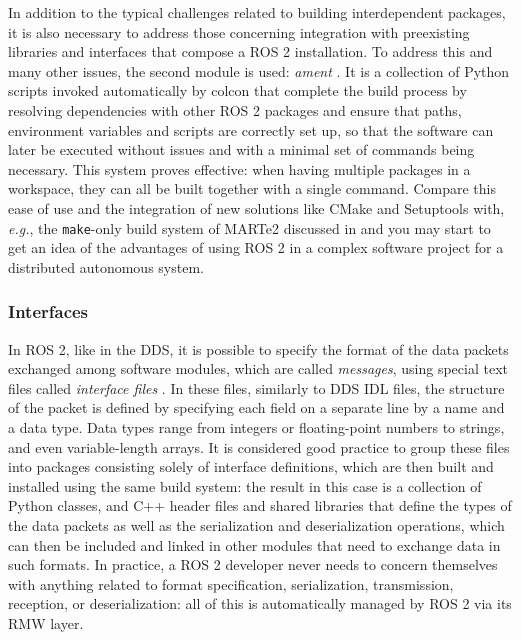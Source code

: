In addition to the typical challenges related to building interdependent packages, it is also necessary to address those concerning integration with preexisting libraries and interfaces that compose a ROS 2 installation. To address this and many other issues, the second module is used: \emph{ament} \cite{thomas_build_2015}. It is a collection of Python scripts invoked automatically by colcon that complete the build process by resolving dependencies with other ROS 2 packages and ensure that paths, environment variables and scripts are correctly set up, so that the software can later be executed without issues and with a minimal set of commands being necessary. This system proves effective: when having multiple packages in a workspace, they can all be built together with a single command. Compare this ease of use and the integration of new solutions like CMake and Setuptools with, \emph{e.g.}, the \texttt{make}-only build system of MARTe2 discussed in  and you may start to get an idea of the advantages of using ROS 2 in a complex software project for a distributed autonomous system.

\subsubsection{Interfaces}
\label{sec:ros2_interfaces}
In ROS 2, like in the DDS, it is possible to specify the format of the data packets exchanged among software modules, which are called \emph{messages}, using special text files called \emph{interface files} \cite{thomas_interface_2019}. In these files, similarly to DDS IDL files, the structure of the packet is defined by specifying each field on a separate line by a name and a data type. Data types range from integers or floating-point numbers to strings, and even variable-length arrays. It is considered good practice to group these files into packages consisting solely of interface definitions, which are then built and installed using the same build system: the result in this case is a collection of Python classes, and C++ header files and shared libraries that define the types of the data packets as well as the serialization and deserialization operations, which can then be included and linked in other modules that need to exchange data in such formats. In practice, a ROS 2 developer never needs to concern themselves with anything related to format specification, serialization, transmission, reception, or deserialization: all of this is automatically managed by ROS 2 via its RMW layer.

